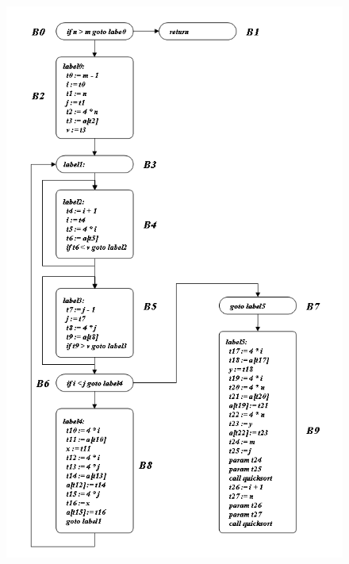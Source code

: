 \begin{figure}[htbp]
\begin{center}
\begin{htmlonly}
\includegraphics[width=1.01\linewidth,height=1.75\linewidth]{quicksort.png}
\end{htmlonly}
\begin{latexonly}

\end{latexonly}
\end{center}
\end{figure}
